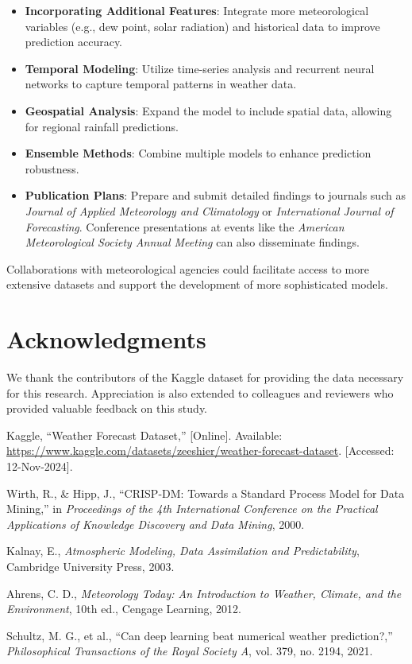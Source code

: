 \documentclass[12pt]{article}
\begin{document}
\begin{itemize}
    \item \textbf{Incorporating Additional Features}: Integrate more meteorological variables (e.g., dew point, solar radiation) and historical data to improve prediction accuracy.
    \item \textbf{Temporal Modeling}: Utilize time-series analysis and recurrent neural networks to capture temporal patterns in weather data.
    \item \textbf{Geospatial Analysis}: Expand the model to include spatial data, allowing for regional rainfall predictions.
    \item \textbf{Ensemble Methods}: Combine multiple models to enhance prediction robustness.
    \item \textbf{Publication Plans}: Prepare and submit detailed findings to journals such as \textit{Journal of Applied Meteorology and Climatology} or \textit{International Journal of Forecasting}. Conference presentations at events like the \textit{American Meteorological Society Annual Meeting} can also disseminate findings.
\end{itemize}

Collaborations with meteorological agencies could facilitate access to more extensive datasets and support the development of more sophisticated models.

\section{Acknowledgments}
We thank the contributors of the Kaggle dataset for providing the data necessary for this research. Appreciation is also extended to colleagues and reviewers who provided valuable feedback on this study.

\begin{thebibliography}{9}
Kaggle, ``Weather Forecast Dataset,'' [Online]. Available: \url{https://www.kaggle.com/datasets/zeeshier/weather-forecast-dataset}. [Accessed: 12-Nov-2024].

Wirth, R., \& Hipp, J., ``CRISP-DM: Towards a Standard Process Model for Data Mining,'' in \textit{Proceedings of the 4th International Conference on the Practical Applications of Knowledge Discovery and Data Mining}, 2000.

Kalnay, E., \textit{Atmospheric Modeling, Data Assimilation and Predictability}, Cambridge University Press, 2003.

Ahrens, C. D., \textit{Meteorology Today: An Introduction to Weather, Climate, and the Environment}, 10th ed., Cengage Learning, 2012.

Schultz, M. G., et al., ``Can deep learning beat numerical weather prediction?,'' \textit{Philosophical Transactions of the Royal Society A}, vol. 379, no. 2194, 2021.

\end{thebibliography}
\end{document}
